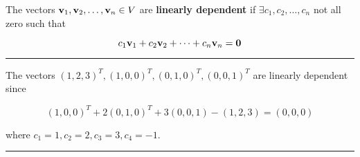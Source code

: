  
 
 
 
 
 
 
 
 
 
 
 
 
 
 
 
 
 

\begin{tcolorbox}[colback=yellow!10!,colframe=gray!15!]
	\begin{definition}
		The vectors ${\bf v}_1, {\bf v}_2,  \dots, {\bf v}_n \in V$ are \textbf{linearly dependent} if $\exists c_1, c_2, \dots, c_n$ not all zero such that 
		
\[  c_1 {\bf v}_1 + c_2 {\bf v}_2 + \cdots + c_n {\bf v}_n = {\bf 0} \]

	\end{definition}
	 
\end{tcolorbox}

 
\rule[0.01in]{\textwidth}{0.0025in}
































\begin{example}
The vectors $(1,2,3)^T, (1, 0, 0)^T, (0, 1, 0)^T, (0, 0, 1)^T$ are linearly dependent since  

\[  (1, 0, 0)^T + 2 (0, 1, 0)^T + 3(0, 0, 1) - (1, 2, 3) = (0,0,0)  \]

where $c_1 = 1, c_2 = 2, c_3 = 3, c_4 = -1$.  


 \end{example}
	
	 
\rule[0.01in]{\textwidth}{0.0025in}


 
 
 
 
